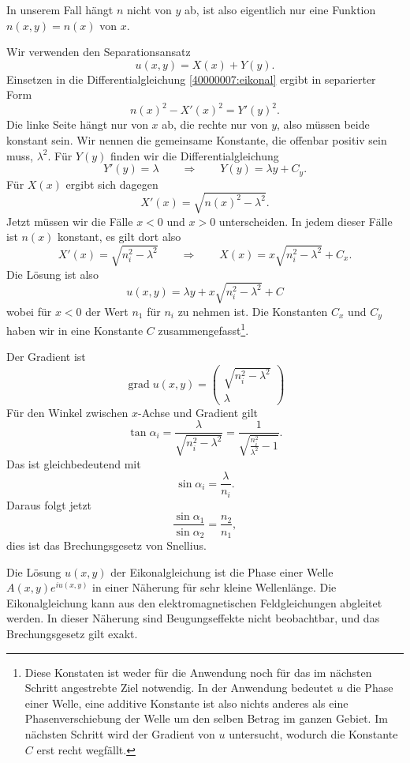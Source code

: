 \begin{loesung}
In unserem Fall hängt $n$ nicht von $y$ ab, ist also eigentlich
nur eine Funktion $n(x,y)=n(x)$ von $x$.
\begin{teilaufgaben}
\item
Wir verwenden den Separationsansatz
\[
u(x,y)=X(x) + Y(y).
\]
Einsetzen in die Differentialgleichung
\eqref{40000007:eikonal} ergibt in separierter Form
\[
n(x)^2-X'(x)^2=Y'(y)^2.
\]
Die linke Seite hängt nur von $x$ ab, die rechte nur von $y$,
also müssen beide konstant sein.
Wir nennen die gemeinsame Konstante, die offenbar positiv sein
muss, $\lambda^2$.
Für $Y(y)$ finden wir die Differentialgleichung
\[
Y'(y)=\lambda \qquad\Rightarrow\qquad Y(y)=\lambda y+ C_y.
\]
Für $X(x)$ ergibt sich dagegen
\[
X'(x)=\sqrt{n(x)^2-\lambda^2}.
\]
Jetzt müssen wir die Fälle $x<0$ und $x>0$ unterscheiden.
In jedem dieser Fälle ist $n(x)$ konstant, es gilt dort
also
\[
X'(x)=\sqrt{n_i^2-\lambda^2}
\qquad
\Rightarrow
\qquad
X(x)=x\sqrt{n_i^2-\lambda^2} + C_x.
\]
Die Lösung ist also
\[
u(x,y)=\lambda y + x\sqrt{n_i^2-\lambda^2} + C
\]
wobei für $x<0$ der Wert $n_1$ für $n_i$ zu nehmen ist.
Die Konstanten $C_x$ und $C_y$ haben wir in eine Konstante $C$
zusammengefasst\footnote{Diese Konstaten ist weder für die Anwendung noch
für das im nächsten Schritt angestrebte Ziel notwendig. In der Anwendung
bedeutet $u$ die Phase einer Welle, eine additive Konstante ist also nichts
anderes als eine Phasenverschiebung der Welle um den selben Betrag
im ganzen Gebiet. Im nächsten Schritt wird der Gradient von $u$ untersucht,
wodurch die Konstante $C$ erst recht wegfällt.}.
\item
Der Gradient ist
\[
\operatorname{grad}u(x,y)
=
\begin{pmatrix}
\sqrt{n_i^2-\lambda^2}\\
\lambda
\end{pmatrix}
\]
Für den Winkel zwischen $x$-Achse und Gradient gilt
\[
\tan\alpha_i
=
\frac{\lambda}{\sqrt{n_i^2-\lambda^2}}
=
\frac1{\sqrt{\frac{n_i^2}{\lambda^2}-1}}.
\]
Das ist gleichbedeutend mit
\[
\sin\alpha_i=\frac{\lambda}{n_i}.
\]
Daraus folgt jetzt
\[
\frac{ \sin\alpha_1}{\sin\alpha_2}=\frac{n_2}{n_1},
\]
dies ist das Brechungsgesetz von Snellius.
\qedhere
\end{teilaufgaben}
\end{loesung}

\begin{diskussion}
Die Lösung $u(x,y)$ der Eikonalgleichung ist die Phase einer Welle
$A(x,y)e^{iu(x,y)}$ in einer Näherung für sehr kleine Wellenlänge.
Die Eikonalgleichung kann aus den elektromagnetischen Feldgleichungen
abgleitet werden.
In dieser Näherung sind Beugungseffekte nicht beobachtbar, und das
Brechungsgesetz gilt exakt.
\end{diskussion}
